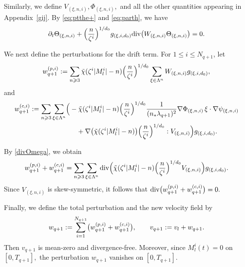 \documentclass[UTF-8,reqno]{amsart}
\numberwithin{equation}{section}
\theoremstyle{definition}
\def\geq{\geqslant}
\def\leq{\leqslant}
\def\div{\mathord{{\rm div}}}
\def\geq{\geqslant}
\def\leq{\leqslant}
\def\div{\mathord{{\rm div}}}
\begin{document}
Similarly, we define
$
V_{(\xi,n,i)},
\Phi_{(\xi,n,i)},
$
and all the other quantities appearing in Appendix~\ref{gij}. 
By \eqref{eq:ptthe+} and \eqref{eq:parth}, we have
\begin{align}
\partial_t\Theta_{(\xi,n,i)}
+
\Bigl(\frac{n}{\zeta^i}\Bigr)^{1/d_0}
g_{(\xi,i,d_0)}
\div\bigl(
W_{(\xi,n,i)}\Theta_{(\xi,n,i)}
\bigr)
=
0.
\label{eq:4ptthe+n}
\end{align}

We next define the perturbations for the drift term. 
For $1\leq i\leq N_{q+1}$, let
\begin{align*}
w_{q+1}^{(p,i)}
:=
\sum_{n\geq3}
\tilde{\chi}(\zeta^i|M_l^i|-n)
\Bigl(\frac{n}{\zeta^i}\Bigr)^{1/d_0}
\sum_{\xi\in\Lambda^n}
W_{(\xi,n,i)}g_{(\xi,i,d_0)},
\end{align*}
and
\begin{align*}
w_{q+1}^{(c,i)}
:=
\sum_{n\geq3}
\sum_{\xi\in\Lambda^n}
\Bigl(
&
-\tilde{\chi}(\zeta^i|M_l^i|-n)
\Bigl(\frac{n}{\zeta^i}\Bigr)^{1/d_0}
\frac1{(n_*\lambda_{q+1})^2}
\nabla\Phi_{(\xi,n,i)}
\,\xi\cdot\nabla\psi_{(\xi,n,i)}
\\
&\quad
+
\nabla\bigl(
\tilde{\chi}(\zeta^i|M_l^i|-n)
\bigr)
\Bigl(\frac{n}{\zeta^i}\Bigr)^{1/d_0}
:V_{(\xi,n,i)}
\Bigr)
g_{(\xi,i,d_0)}.
\end{align*}

By \eqref{divOmega}, we obtain
\begin{align}
w_{q+1}^{(p,i)}
+
w_{q+1}^{(c,i)}
=
\sum_{n\geq3}
\sum_{\xi\in\Lambda^n}
\div\Bigl(
\tilde{\chi}(\zeta^i|M_l^i|-n)
\Bigl(\frac{n}{\zeta^i}\Bigr)^{1/d_0}
V_{(\xi,n,i)}
\Bigr)
g_{(\xi,i,d_0)}.
\label{eq:4wq+1p+wq+1c}
\end{align}
Since $V_{(\xi,n,i)}$ is skew-symmetric, it follows that
$
\div\bigl(
w_{q+1}^{(p,i)}
+
w_{q+1}^{(c,i)}
\bigr)=0.
$

Finally, we define the total perturbation and the new velocity field by
\begin{align}
w_{q+1}
:=
\sum_{i=1}^{N_{q+1}}
\bigl(
w_{q+1}^{(p,i)}
+
w_{q+1}^{(c,i)}
\bigr),
\qquad
v_{q+1}
:=
v_l+w_{q+1}.
\notag
\end{align}
Then $v_{q+1}$ is mean-zero and divergence-free.
Moreover, since $M_l^i(t)=0$ on $[0,T_{q+1}],$ the perturbation $w_{q+1} $  vanishes on $[0,T_{q+1}]$.
 
\end{document}
